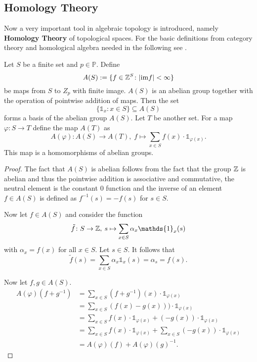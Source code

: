 \subsection{Homology Theory}
Now a very important tool in algebraic topology is introduced, namely \textbf{Homology Theory} of topological spaces. For the basic definitions from category theory and homological algebra needed in the following see \cite{rotman2009}.  

\begin{cons}
  Let $S$ be a finite set and $p \in \mathbb{P}$. Define \[A(S) := \{f \in \mathbb{Z}^S\colon |{\rm im} f| < \infty \}\] be maps from $S$ to $Z_p$ with finite image. $A(S)$ is an abelian group together with the operation of pointwise addition of maps.
  Then the set \[\{\mathds{1}_x\colon x\in S\} \subseteq A(S)\] forms a basis of the abelian group $A(S)$.
  Let $T$ be another set. For a map $\varphi\colon S \to T$ define the map $A(T)$ as
  \begin{equation*}
    A(\varphi)\colon A(S) \to A(T),\; f \mapsto \sum\limits_{x \in S}f(x)\cdot \mathds{1}_{\varphi(x)}.
  \end{equation*}
  This map is a homomorphisms of abelian groups.
\end{cons}

\begin{proof} 
  The fact that $A(S)$ is abelian follows from the fact that the group $\mathbb{Z}$ is abelian and thus the pointwise addition is associative and commutative, the neutral element is the constant $0$ function and the inverse of an element $f \in A(S)$ is defined as $f^{-1}(s) = -f(s)$ for $s \in S$.

  Now let $f \in A(S)$ and consider the function \[\tilde{f}\colon S \to \Z, \: s \mapsto \sum\limits_{x\in S} \alpha_x \mathds{1}_x(s)\] with $\alpha_x = f(x)$ for all $x \in S$. Let $s \in S$. It follows that
  \begin{equation*}
    \tilde{f}(s) = \sum\limits_{x \in S} \alpha_x \mathds{1}_x(s) = \alpha_s = f(s).
  \end{equation*}

  Now let $f,g \in A(S)$.
  \begin{align*}
    A(\varphi)(f+g^{-1}) &= \sum\limits_{x\in S} (f+g^{-1})(x)\cdot \mathds{1}_{\varphi(x)} \\
                        &= \sum\limits_{x\in S} (f(x)-g(x)))\cdot \mathds{1}_{\varphi(x)} \\
                        &= \sum\limits_{x\in S} f(x)\cdot\mathds{1}_{\varphi(x)} + (-g(x))\cdot \mathds{1}_{\varphi(x)} \\
                        &= \sum\limits_{x\in S} f(x)\cdot\mathds{1}_{\varphi(x)} + \sum\limits_{x\in S} (-g(x))\cdot \mathds{1}_{\varphi(x)} \\
                        &= A(\varphi)(f) + A(\varphi)(g)^{-1}.  
  \end{align*}
\end{proof}


